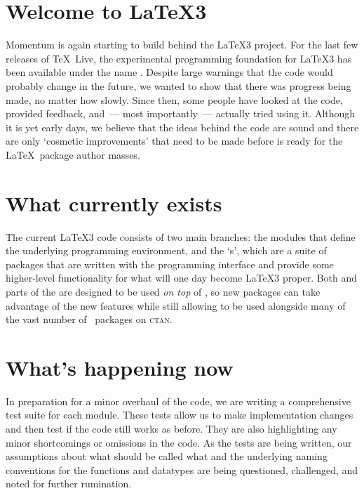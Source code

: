 \documentclass{ltnews}
\begin{document}
\maketitle

\section{Welcome to \LaTeX3}

Momentum is again starting to build behind the \LaTeX3 project. For the
last few releases of \TeX~Live, the experimental programming foundation for
\LaTeX3 has been available under the name . Despite large
warnings that the code would probably change in the future, we wanted to show
that there was progress being made, no matter how slowly. Since then, some
people have looked at the code, provided feedback, and~--- most
importantly~--- actually tried using it. Although it is yet early days, we
believe that the ideas behind the code are sound and there are only `cosmetic
improvements' that need to be made before  is ready for the
\LaTeX~package author masses.

\section{What currently exists}

The current \LaTeX3 code consists of two main branches: the
 modules that define the underlying programming environment,
and the `s', which are a suite of packages that are written
with the  programming interface and provide some higher-level
functionality for what will one day become \LaTeX3 proper. Both  and
parts of the  are designed to be used \emph{on top} of
\LaTeXe, so new packages can take advantage of the new features while still
allowing to be used alongside many of the vast number of \LaTeXe\ packages on 
\textsc{ctan}.

\section{What's happening now}

In preparation for a minor overhaul of the  code, we are
writing a comprehensive test suite for each module. These tests allow us to
make implementation changes and then test if the code still works as before. 
They are also highlighting any minor shortcomings or omissions in the code.
As the tests are being written, our assumptions about what should be called
what and the underlying naming conventions for the functions and datatypes are
being questioned, challenged, and noted for further rumination.
\end{document}
